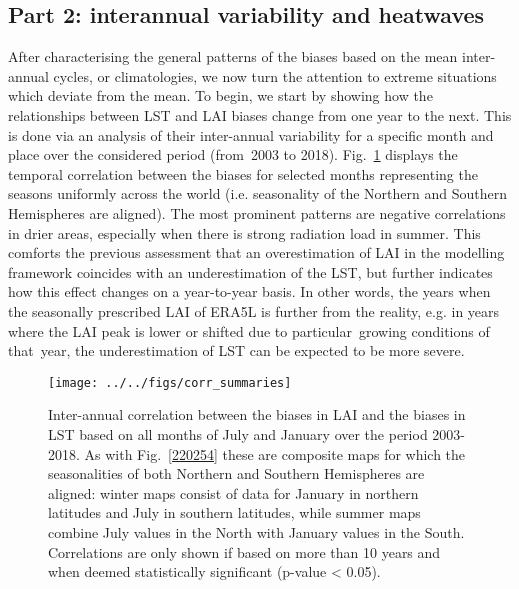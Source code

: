 \documentclass[gmd, manuscript]{copernicus}
\begin{document}
{\par\null\par\null

\subsection*{Part 2: interannual variability and
heatwaves}

{\label{296419}}

After characterising the general patterns of the biases based on the
mean inter-annual cycles, or climatologies, we now turn the attention to
extreme situations which deviate from the mean. To begin, we start by
showing how the relationships between LST and LAI biases change from one
year to the next. This is done via an analysis of their inter-annual
variability for a specific month and place over the considered period
(from~{2003} to 2018). Fig.~{\ref{891702}} displays the
temporal correlation between the biases for selected months representing
the seasons uniformly across the world (i.e. seasonality of the Northern
and Southern Hemispheres are aligned). The most prominent patterns are
negative correlations in drier areas, especially when there is strong
radiation load in summer. This comforts the previous assessment that an
overestimation of LAI in the modelling framework coincides with an
underestimation of the LST, but further indicates how this effect
changes on a year-to-year basis. In other words, the years when the
seasonally prescribed LAI of ERA5L is further from the reality, e.g. in
years where the LAI peak is lower or shifted due to particular~growing
conditions of that~year, the underestimation of LST can be expected to
be more severe.~

\par\null{}
\begin{figure}[H]
\begin{center}
\texttt{[image: ../../figs/corr\_summaries]}
\caption{{Inter-annual correlation between the biases in LAI and the biases in LST
based on all months of July and January over the period 2003-2018. As
with Fig.~{\ref{220254}} these are composite maps for
which the seasonalities of both Northern and Southern Hemispheres are
aligned: winter maps consist of data for January in northern latitudes
and July in southern latitudes, while summer maps combine July values in
the North with January values in the South. Correlations are only shown if based on more than 10 years and when deemed statistically significant (p-value < 0.05).
{\label{891702}}%
}}
\end{center}
\end{figure}

}
\end{document}
